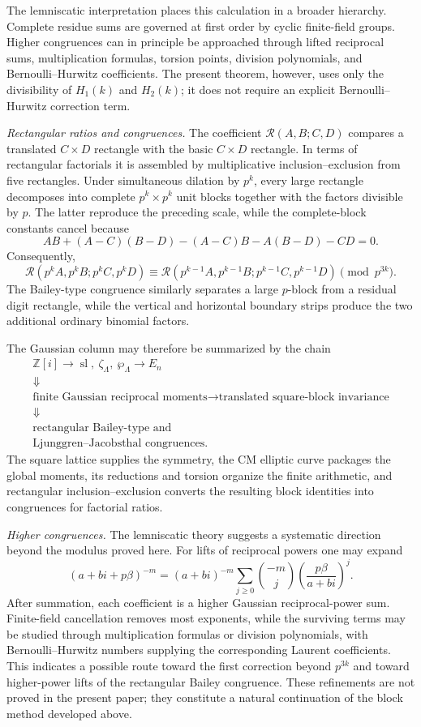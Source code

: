 \documentclass[a4paper,american,11pt]{amsart}
\numberwithin{equation}{section}
\theoremstyle{definition}
\newcommand{\Z}{\mathbb Z}
\newcommand{\Rect}{\mathcal R}
\DeclareMathOperator{\slf}{sl}
\begin{document}
The lemniscatic interpretation places this calculation in a broader hierarchy. Complete residue sums are governed at first order by cyclic finite-field groups. Higher congruences can in principle be approached through lifted reciprocal sums, multiplication formulas, torsion points, division polynomials, and Bernoulli--Hurwitz coefficients. The present theorem, however, uses only the divisibility of $H_1(k)$ and $H_2(k)$; it does not require an explicit Bernoulli--Hurwitz correction term.

\emph{Rectangular ratios and congruences.}
The coefficient $\Rect(A,B;C,D)$ compares a translated $C\times D$ rectangle with the basic $C\times D$ rectangle. In terms of rectangular factorials it is assembled by multiplicative inclusion--exclusion from five rectangles. Under simultaneous dilation by $p^k$, every large rectangle decomposes into complete $p^k\times p^k$ unit blocks together with the factors divisible by $p$. The latter reproduce the preceding scale, while the complete-block constants cancel because
\[
AB+(A-C)(B-D)-(A-C)B-A(B-D)-CD=0.
\]
Consequently,
\[
\Rect(p^kA,p^kB;p^kC,p^kD)
\equiv
\Rect(p^{k-1}A,p^{k-1}B;p^{k-1}C,p^{k-1}D)
\pmod{p^{3k}}.
\]
The Bailey-type congruence similarly separates a large $p$-block from a residual digit rectangle, while the vertical and horizontal boundary strips produce the two additional ordinary binomial factors.

The Gaussian column may therefore be summarized by the chain
\[
\begin{gathered}
\Z[i]
\longrightarrow
\slf,\ \zeta_\Lambda,\ \wp_\Lambda
\longrightarrow
E_n\\
\Downarrow\\[-2pt]
\text{finite Gaussian reciprocal moments}
\longrightarrow
\text{translated square-block invariance}\\
\Downarrow\\[-2pt]
\text{rectangular Bailey-type and}\\[-2pt]
\text{Ljunggren--Jacobsthal congruences}.
\end{gathered}
\]
The square lattice supplies the symmetry, the CM elliptic curve packages the global moments, its reductions and torsion organize the finite arithmetic, and rectangular inclusion--exclusion converts the resulting block identities into congruences for factorial ratios.

\emph{Higher congruences.}
The lemniscatic theory suggests a systematic direction beyond the modulus proved here. For lifts of reciprocal powers one may expand
\[
(a+bi+p\beta)^{-m}
=
(a+bi)^{-m}
\sum_{j\geq0}
\binom{-m}{j}
\left(\frac{p\beta}{a+bi}\right)^j.
\]
After summation, each coefficient is a higher Gaussian reciprocal-power sum. Finite-field cancellation removes most exponents, while the surviving terms may be studied through multiplication formulas or division polynomials, with Bernoulli--Hurwitz numbers supplying the corresponding Laurent coefficients. This indicates a possible route toward the first correction beyond $p^{3k}$ and toward higher-power lifts of the rectangular Bailey congruence. These refinements are not proved in the present paper; they constitute a natural continuation of the block method developed above.
\end{document}
